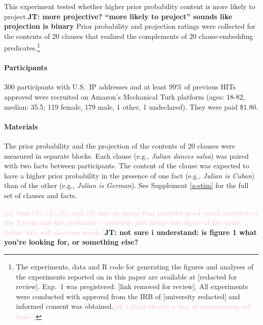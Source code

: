 \documentclass[11pt,fleqn]{article}
\newcommand{\jd}[1]{\textcolor{Pink}{[jd: #1]}}
\newcommand{\jt}[1]{\textbf{\color{blue}JT: #1}}
\newcommand{\6}{\mbox{$[\hspace*{-.6mm}[$}}
\newcommand{\9}{\mbox{$]\hspace*{-.6mm}]$}}
\begin{document}
This experiment tested whether higher prior probability content is more likely to project.\jt{more projective? ``more likely to project'' sounds like projection is binary} Prior probability and projection ratings were collected for the contents of 20 clauses that realized the complements of 20 clause-embedding predicates.\footnote{\label{f-github}The experiments, data and R code for generating the figures and analyses of the experiments reported on in this paper are available at [redacted for review]. Exp.~1 was pregistered: [link removed for review]. All experiments were conducted with approval from the IRB of [university redacted] and informed consent was obtained.\jd{i think there's a way of anonymizing osf links?}}

\paragraph{Participants} 300 participants with U.S.\ IP addresses and at least 99\% of previous HITs approved were recruited on Amazon's Mechanical Turk platform (ages: 18-82, median: 35.5; 119 female, 179 male, 1 other, 1 undeclared). They were paid \$1.80.

\paragraph{Materials} The prior probability and the projection of the contents of 20 clauses were measured in separate blocks. Each clause (e.g., \emph{Julian dances salsa}) was paired with two facts between participants. The content of the clause was expected to have a higher prior probability in the presence of one fact (e.g., \emph{Julian is Cuban}) than of the other (e.g., \emph{Julian is German}). See Supplement \ref{a-stim} for the full set of clauses and facts. 


\jd{turn (3), (4), (5), and (6) into an image that provides good visual overview of the 2 tasks and the predicates -- probably just merge into figure of the tasks below. this will also save words.}\jt{not sure i understand: is figure 1 what you're looking for, or something else?}
\end{document}

